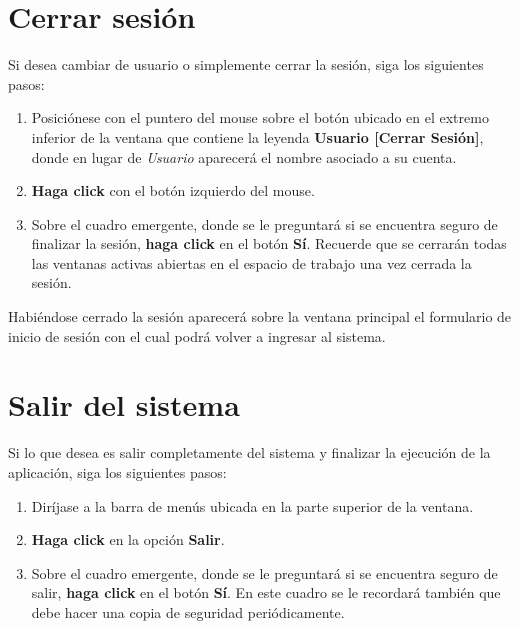 \documentclass{book}
\begin{document}
\section{Cerrar sesión}

Si desea cambiar de usuario o simplemente cerrar la sesión, siga los siguientes pasos:
\medskip

\begin{enumerate}
	\itemsep=8pt \topsep=0pt \partopsep=0pt \parskip=0pt \parsep=0pt
	
	\item Posiciónese con el puntero del mouse sobre el botón ubicado en el extremo inferior de la ventana que contiene la leyenda \textbf{Usuario [Cerrar Sesión]}, donde en lugar de \textit{Usuario} aparecerá el nombre asociado a su cuenta.

	\item \textbf{Haga click} con el botón izquierdo del mouse.

	\item Sobre el cuadro emergente, donde se le preguntará si se encuentra seguro de finalizar la sesión, \textbf{haga click} en el botón \textbf{Sí}. Recuerde que se cerrarán todas las ventanas activas abiertas en el espacio de trabajo una vez cerrada la sesión.

\end{enumerate}
\medskip

Habiéndose cerrado la sesión aparecerá sobre la ventana principal el formulario de inicio de sesión con el cual podrá volver a ingresar al sistema.
\bigskip



\section{Salir del sistema}

Si lo que desea es salir completamente del sistema y finalizar la ejecución de la aplicación, siga los siguientes pasos:
\medskip

\begin{enumerate}
	\itemsep=8pt \topsep=0pt \partopsep=0pt \parskip=0pt \parsep=0pt
	
	\item Diríjase a la barra de menús ubicada en la parte superior de la ventana.

	\item \textbf{Haga click} en la opción \textbf{Salir}.

	\item Sobre el cuadro emergente, donde se le preguntará si se encuentra seguro de salir, \textbf{haga click} en el botón \textbf{Sí}. En este cuadro se le recordará también que debe hacer una copia de seguridad periódicamente.

\end{enumerate}
\medskip
\end{document}
